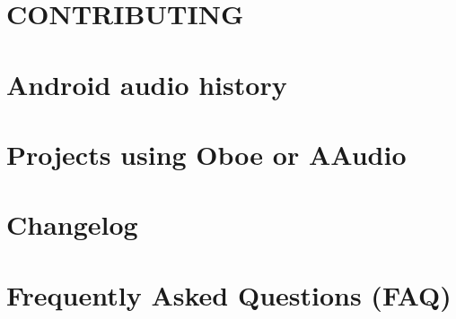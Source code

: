 \let\mypdfximage\pdfximage\def\pdfximage{\immediate\mypdfximage}\documentclass[twoside]{book}
\newcommand{\+}{\discretionary{\mbox{\scriptsize$\hookleftarrow$}}{}{}}
\begin{document}
\chapter{C\+O\+N\+T\+R\+I\+B\+U\+T\+I\+NG}
\label{md__c_1__users_fab_src__github_branches__neural_amp_modeler_plugin_i_plug2__dependencies__build_1b3925abee73e3cf2e2fc98b64a64c2b}

\chapter{Android audio history}
\label{md__c_1__users_fab_src__github_branches__neural_amp_modeler_plugin_i_plug2__dependencies__build_710e5c154c8d74f571f8cf1131ef55ac}

\chapter{Projects using Oboe or A\+Audio}
\label{md__c_1__users_fab_src__github_branches__neural_amp_modeler_plugin_i_plug2__dependencies__build_eaa29ea4925ded05a8fb860ef2ddc8c2}

\chapter{Changelog}
\label{md__c_1__users_fab_src__github_branches__neural_amp_modeler_plugin_i_plug2__dependencies__build_3b42e6d8e84e33310e462cc10f5a63fb}

\chapter{Frequently Asked Questions (F\+AQ)}
\label{md__c_1__users_fab_src__github_branches__neural_amp_modeler_plugin_i_plug2__dependencies__build_9f5163de341a60ef99d4bc810dc40869}

\end{document}
